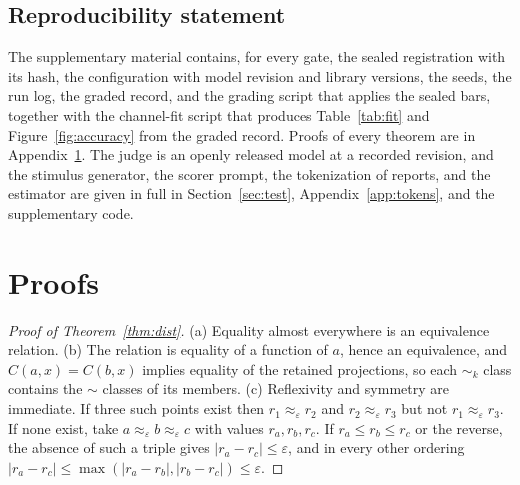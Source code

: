 \documentclass{article}
\theoremstyle{definition}
\theoremstyle{remark}
\begin{document}
\subsection*{Reproducibility statement}
The supplementary material contains, for every gate, the sealed registration with its hash, the configuration with model revision and library versions, the seeds, the run log, the graded record, and the grading script that applies the sealed bars, together with the channel-fit script that produces Table~\ref{tab:fit} and Figure~\ref{fig:accuracy} from the graded record.
Proofs of every theorem are in Appendix~\ref{app:proofs}.
The judge is an openly released model at a recorded revision, and the stimulus generator, the scorer prompt, the tokenization of reports, and the estimator are given in full in Section~\ref{sec:test}, Appendix~\ref{app:tokens}, and the supplementary code.




\appendix

\section{Proofs}
\label{app:proofs}

\begin{proof}[Proof of Theorem~\ref{thm:dist}]
(a) Equality almost everywhere is an equivalence relation.
(b) The relation is equality of a function of $a$, hence an equivalence, and $C(a,x)=C(b,x)$ implies equality of the retained projections, so each $\sim_{k}$ class contains the $\sim$ classes of its members.
(c) Reflexivity and symmetry are immediate.
If three such points exist then $r_{1}\approx_{\varepsilon}r_{2}$ and $r_{2}\approx_{\varepsilon}r_{3}$ but not $r_{1}\approx_{\varepsilon}r_{3}$.
If none exist, take $a\approx_{\varepsilon}b\approx_{\varepsilon}c$ with values $r_{a},r_{b},r_{c}$.
If $r_{a}\le r_{b}\le r_{c}$ or the reverse, the absence of such a triple gives $|r_{a}-r_{c}|\le\varepsilon$, and in every other ordering $|r_{a}-r_{c}|\le\max(|r_{a}-r_{b}|,|r_{b}-r_{c}|)\le\varepsilon$.
\end{proof}
\end{document}
